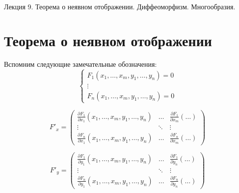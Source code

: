 \documentclass[11pt]{article}
\begin{document}
\begin{titlepage}
    \centering
    \vspace*{\fill}  %

    {\Huge Лекция 9. Теорема о неявном отображении. Диффеоморфизм. Многообразия.
    \par}

    \vspace*{\fill}  %
\end{titlepage}

\setcounter{page}{1}

\section{Теорема о неявном отображении}

\begin{remark}
    Вспомним следующие замечательные обозначения:
    \begin{equation*} \label{eq:system1} \tag{$\ast$}
        \begin{cases}
            F_1(x_1, \dots, x_m, y_1, \dots, y_n) = 0 \\
            \vdots \\
            F_n(x_1, \dots, x_m, y_1, \dots, y_n) = 0
        \end{cases}
    \end{equation*}
    
    \begin{equation*}
        F'_x = 
        \begin{pmatrix}
            \displaystyle \frac{\partial F_1}{\partial x_1} \left(x_1, \dots, x_m, y_1, \dots, y_n \right) & \ldots & \displaystyle \frac{\partial F_1}{\partial x_m} \left( \dots \right) \\
            \displaystyle \vdots & \ddots & \vdots \\
            \displaystyle \frac{\partial F_n}{\partial x_1} \left(x_1, \dots, x_m, y_1, \dots, y_n \right) & \ldots & \displaystyle \frac{\partial F_n}{\partial x_m} \left( \dots \right)
        \end{pmatrix}
    \end{equation*}

    \begin{equation*}
        F'_y  = 
        \begin{pmatrix}
            \displaystyle \frac{\partial F_1}{\partial y_1} \left(x_1, \dots, x_m, y_1, \dots, y_n \right) & \ldots & \displaystyle \frac{\partial F_1}{\partial y_n} \left( \dots \right) \\
            \displaystyle \vdots & \ddots & \vdots \\
            \displaystyle \frac{\partial F_n}{\partial y_1} \left(x_1, \dots, x_m, y_1, \dots, y_n \right) & \ldots & \displaystyle \frac{\partial F_n}{\partial y_n} \left( \dots \right)
        \end{pmatrix}
    \end{equation*}
\end{remark}
\end{document}
